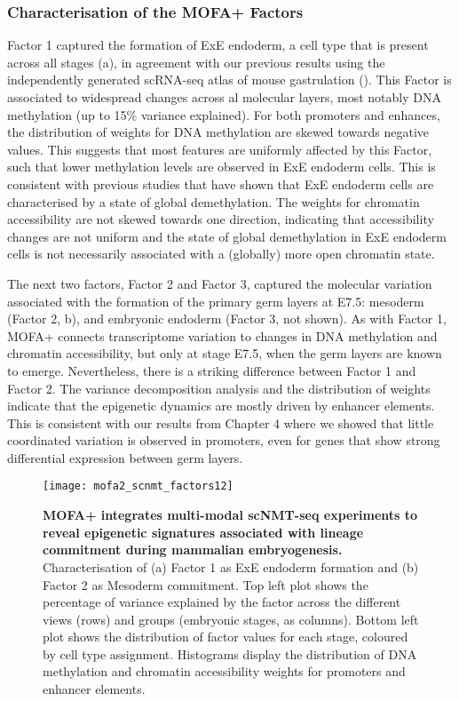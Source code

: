 \subsubsection{Characterisation of the MOFA+ Factors}

Factor 1 captured the formation of ExE endoderm, a cell type that is present across all stages (a), in agreement with our previous results using the independently generated scRNA-seq atlas of mouse gastrulation (). This Factor is associated to widespread changes across al molecular layers, most notably DNA methylation (up to 15\% variance explained). For both promoters and enhances, the distribution of weights for DNA methylation are skewed towards negative values. This suggests that most features are uniformly affected by this Factor, such that lower methylation levels are observed in ExE endoderm cells. This is consistent with previous studies that have shown that ExE endoderm cells are characterised by a state of global demethylation\cite{Zhang2017,Argelaguet2019}. The weights for chromatin accessibility are not skewed towards one direction, indicating that accessibility changes are not uniform and the state of global demethylation in ExE endoderm cells is not necessarily associated with a (globally) more open chromatin state.

The next two factors, Factor 2 and Factor 3, captured the molecular variation associated with the formation of the primary germ layers at E7.5: mesoderm (Factor 2, b), and embryonic endoderm (Factor 3, not shown). As with Factor 1, MOFA+ connects transcriptome variation to changes in DNA methylation and chromatin accessibility, but only at stage E7.5, when the germ layers are known to emerge. Nevertheless, there is a striking difference between Factor 1 and Factor 2. The variance decomposition analysis and the distribution of weights indicate that the epigenetic dynamics are mostly driven by enhancer elements. This is consistent with our results from Chapter 4 where we showed that little coordinated variation is observed in promoters, even for genes that show strong differential expression between germ layers.

\begin{figure}[H]
	\centering
	\texttt{[image: mofa2\_scnmt\_factors12]}
	\caption[]{
	\textbf{MOFA+ integrates multi-modal scNMT-seq experiments to reveal epigenetic signatures associated with lineage commitment during mammalian embryogenesis.} \\
	Characterisation of (a) Factor 1 as ExE endoderm formation and (b) Factor 2 as Mesoderm commitment. Top left plot shows the percentage of variance explained by the factor across the different views (rows) and groups (embryonic stages, as columns). Bottom left plot shows the distribution of factor values for each stage, coloured by cell type assignment. Histograms display the distribution of DNA methylation and chromatin accessibility weights for promoters and enhancer elements.
	}
	\label{fig:mofa2_scnmt_factors12}
\end{figure}

